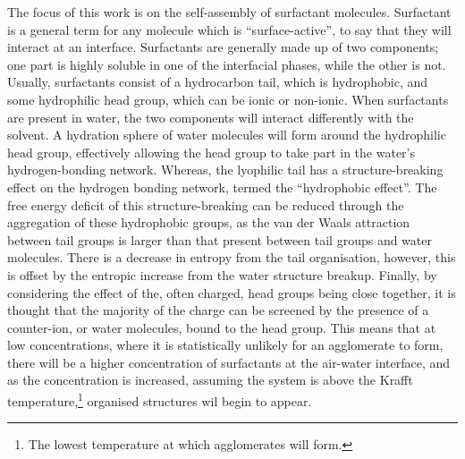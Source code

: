 The focus of this work is on the self-assembly of surfactant molecules.
Surfactant is a general term for any molecule which is ``surface-active'', to say that they will interact at an interface.\autocite{rosen_surfactants_2012}
Surfactants are generally made up of two components; one part is highly soluble in one of the interfacial phases, while the other is not.\autocite{goodwin_colloids_2009}
Usually, surfactants consist of a hydrocarbon tail, which is hydrophobic, and some hydrophilic head group, which can be ionic or non-ionic.
When surfactants are present in water, the two components will interact differently with the solvent.
A hydration sphere of water molecules will form around the hydrophilic head group, effectively allowing the head group to take part in the water's hydrogen-bonding network.
Whereas, the lyophilic tail has a structure-breaking effect on the hydrogen bonding network, termed the ``hydrophobic effect''.
The free energy deficit of this structure-breaking can be reduced through the aggregation of these hydrophobic groups, as the van der Waals attraction between tail groups is larger than that present between tail groups and water molecules.
There is a decrease in entropy from the tail organisation, however, this is offset by the entropic increase from the water structure breakup.
Finally, by considering the effect of the, often charged, head groups being close together, it is thought that the majority of the charge can be screened by the presence of a counter-ion, or water molecules, bound to the head group.\autocite{goodwin_colloids_2009}
This means that at low concentrations, where it is statistically unlikely for an agglomerate to form, there will be a higher concentration of surfactants at the air-water interface, and as the concentration is increased, assuming the system is above the Krafft temperature,\footnote{The lowest temperature at which agglomerates will form.} organised structures wil begin to appear.

